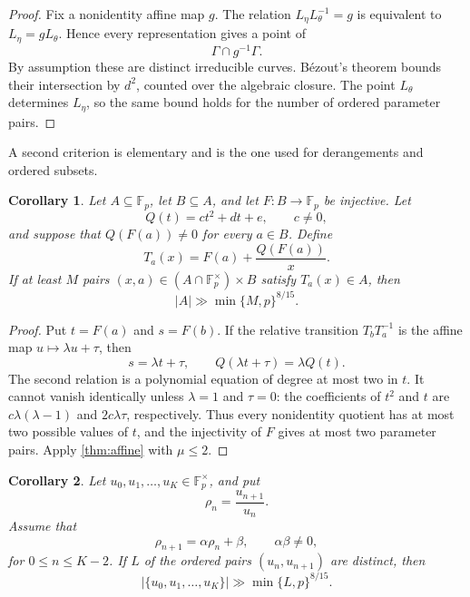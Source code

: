 \documentclass[11pt,reqno]{amsart}
\numberwithin{equation}{section}
\newtheorem{corollary}[corollary]{Corollary}
\theoremstyle{definition}
\theoremstyle{remark}
\newcommand{\F}{\mathbb F}
\begin{document}
\begin{proof}
Fix a nonidentity affine map $g$.  The relation $L_\eta L_\theta^{-1}=g$ is equivalent to $L_\eta=gL_\theta$.  Hence every representation gives a point of
\[
  \Gamma\cap g^{-1}\Gamma.
\]
By assumption these are distinct irreducible curves.  B\'ezout's theorem bounds their intersection by $d^2$, counted over the algebraic closure.  The point $L_\theta$ determines $L_\eta$, so the same bound holds for the number of ordered parameter pairs.
\end{proof}

A second criterion is elementary and is the one used for derangements and ordered subsets.

\begin{corollary}\label{cor:quadratic-reciprocal}
Let $A\subseteq\F_p$, let $B\subseteq A$, and let $F:B\to\F_p$ be injective.  Let
\[
  Q(t)=ct^2+dt+e,
  \qquad c\ne0,
\]
and suppose that $Q(F(a))\ne0$ for every $a\in B$.  Define
\begin{equation}\label{eq:quadratic-transition}
  T_a(x)=F(a)+\frac{Q(F(a))}{x}.
\end{equation}
If at least $M$ pairs $(x,a)\in(A\cap\F_p^\times)\times B$ satisfy $T_a(x)\in A$, then
\begin{equation}\label{eq:quadratic-bound}
  |A|\gg\min\{M,p\}^{8/15}.
\end{equation}
\end{corollary}

\begin{proof}
Put $t=F(a)$ and $s=F(b)$.  If the relative transition $T_bT_a^{-1}$ is the affine map $u\mapsto\lambda u+\tau$, then
\begin{equation}\label{eq:quadratic-conditions}
  s=\lambda t+\tau,
  \qquad
  Q(\lambda t+\tau)=\lambda Q(t).
\end{equation}
The second relation is a polynomial equation of degree at most two in $t$.  It cannot vanish identically unless $\lambda=1$ and $\tau=0$: the coefficients of $t^2$ and $t$ are $c\lambda(\lambda-1)$ and $2c\lambda\tau$, respectively.  Thus every nonidentity quotient has at most two possible values of $t$, and the injectivity of $F$ gives at most two parameter pairs.  Apply \cref{thm:affine} with $\mu\le2$.
\end{proof}

\begin{corollary}\label{cor:affine-ratio}
Let $u_0,u_1,\ldots,u_K\in\F_p^\times$, and put
\[
  \rho_n=\frac{u_{n+1}}{u_n}.
\]
Assume that
\begin{equation}\label{eq:affine-ratio-recurrence}
  \rho_{n+1}=\alpha\rho_n+\beta,
  \qquad \alpha\beta\ne0,
\end{equation}
for $0\le n\le K-2$.  If $L$ of the ordered pairs $(u_n,u_{n+1})$ are distinct, then
\begin{equation}\label{eq:affine-ratio-bound}
  |\{u_0,u_1,\ldots,u_K\}|
  \gg\min\{L,p\}^{8/15}.
\end{equation}
\end{corollary}
\end{document}
